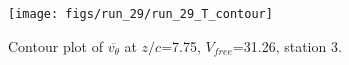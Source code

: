 \begin{figure}[H]
\centering
\texttt{[image: figs/run\_29/run\_29\_T\_contour]}
\caption{Contour plot of $\overline{v_{\theta}}$ at $z/c$=7.75, $V_{free}$=31.26, station 3.}
\label{fig:run_29_T_contour}
\end{figure}


